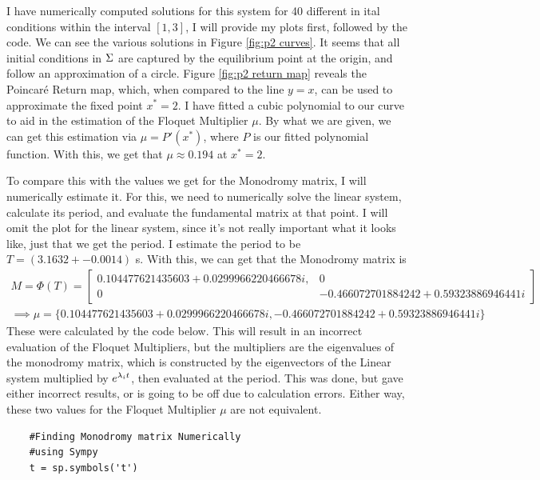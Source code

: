 \partbreak
\begin{solution}

    I have numerically computed solutions for this system for 40 different in ital conditions within the interval $[1, 3]$, I will provide my plots first, followed by the code. We can see the various solutions in Figure \ref{fig:p2 curves}. It seems that all initial conditions in $\Sigma$ are captured by the equilibrium point at the origin, and follow an approximation of a circle. Figure \ref{fig:p2 return map} reveals the Poincar\'e Return map, which, when compared to the line $y = x$, can be used to approximate the fixed point $x^* = 2$. I have fitted a cubic polynomial to our curve to aid in the estimation of the Floquet Multiplier $\mu$. By what we are given, we can get this estimation via $\mu = P'(x^*)$, where $P$ is our fitted polynomial function. With this, we get that $\mu \approx 0.194$ at $x^* = 2$.\par

    \jump
    To compare this with the values we get for the Monodromy matrix, I will numerically estimate it. For this, we need to numerically solve the linear system, calculate its period, and evaluate the fundamental matrix at that point. I will omit the plot for the linear system, since it's not really important what it looks like, just that we get the period. I estimate the period to be $T = (3.1632 +- 0.0014)$ s. With this, we can get that the Monodromy matrix is
    \begin{align}
        M = \Phi(T) = 
        \begin{bmatrix}
            0.104477621435603 + 0.0299966220466678i, &0\\ 0 &-0.466072701884242 + 0.59323886946441i
        \end{bmatrix}\nonumber\\
    \implies \mu = \{0.104477621435603 + 0.0299966220466678i, -0.466072701884242 + 0.59323886946441i\}
    \end{align}
    These were calculated by the code below. This will result in an incorrect evaluation of the Floquet Multipliers, but the multipliers are the eigenvalues of the monodromy matrix, which is constructed by the eigenvectors of the Linear system multiplied by $e^{\lambda_i t}$, then evaluated at the period. This was done, but gave either incorrect results, or is going to be off due to calculation errors. Either way, these two values for the Floquet Multiplier $\mu$ are not equivalent. 
    
    \begin{lstlisting}
    #Finding Monodromy matrix Numerically
    #using Sympy
    t = sp.symbols('t')


\end{lstlisting}
\end{solution}

